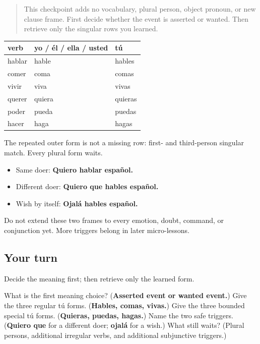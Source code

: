 \label{lesson:ES-C18-practice}



\begin{quote}
This checkpoint adds no vocabulary, plural person, object pronoun, or new clause frame. First decide whether the event is asserted or wanted. Then retrieve only the singular rows you learned.
\end{quote}

\begin{grammarlens}[title={Grammar Lens: the bounded map}]
\noindent
\begin{tabularx}{\linewidth}{@{}>{\raggedright\arraybackslash}X>{\raggedright\arraybackslash}X>{\raggedright\arraybackslash}X@{}}
\toprule
\textbf{verb} & \textbf{yo / él / ella / usted} & \textbf{tú} \\
\midrule
hablar & hable & hables \\
comer & coma & comas \\
vivir & viva & vivas \\
querer & quiera & quieras \\
poder & pueda & puedas \\
hacer & haga & hagas \\
\bottomrule
\end{tabularx}

The repeated outer form is not a missing row: first- and third-person singular match. Every plural form waits.
\end{grammarlens}

\begin{grammarlens}[title={Grammar Lens: two safe triggers}]
\begin{itemize}
\raggedright
  \item Same doer: \textbf{Quiero hablar español.}
  \item Different doer: \textbf{Quiero que hables español.}
  \item Wish by itself: \textbf{Ojalá hables español.}
\end{itemize}

Do not extend these two frames to every emotion, doubt, command, or conjunction yet. More triggers belong in later micro-lessons.
\end{grammarlens}

\subsection*{Your turn}
Decide the meaning first; then retrieve only the learned form.

\begin{tcolorbox}[breakable,colback=teal!4,colframe=teal!35!black,title={Before you move on}]
What is the first meaning choice? (\textbf{Asserted event or wanted event.}) Give the three regular tú forms. (\textbf{Hables, comas, vivas.}) Give the three bounded special tú forms. (\textbf{Quieras, puedas, hagas.}) Name the two safe triggers. (\textbf{Quiero que} for a different doer; \textbf{ojalá} for a wish.) What still waits? (Plural persons, additional irregular verbs, and additional subjunctive triggers.)
\end{tcolorbox}
